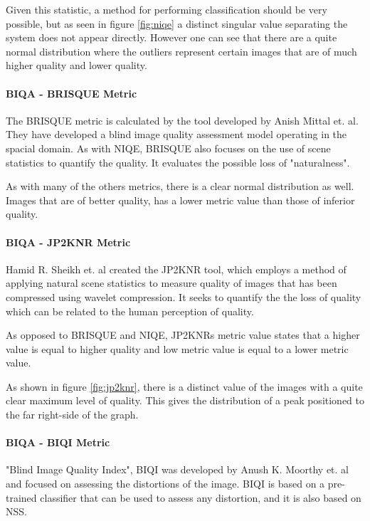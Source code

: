 Given this statistic, a method for performing classification should be very
possible, but as seen in figure \ref{fig:niqe} a distinct singular value
separating the system does not appear directly.  However one can see that there
are a quite normal distribution where the outliers represent certain images that
are of much higher quality and lower quality.


\paragraph{BIQA - BRISQUE Metric}
The BRISQUE metric is calculated by the tool developed by Anish Mittal et.
al\cite{brisque}. They have developed a blind image quality assessment model
operating in the spacial domain.  As with NIQE, BRISQUE also focuses on the use
of scene statistics to quantify the quality.  It evaluates the possible loss of
"naturalness".

As with many of the others metrics, there is a clear normal distribution as
well. Images that are of better quality, has a lower metric value than those of
inferior quality.


\paragraph{BIQA - JP2KNR Metric}
Hamid R. Sheikh et. al created the JP2KNR tool, which employs a method of
applying natural scene statistics to measure quality of images that has been
compressed using wavelet compression.  It seeks to quantify the the loss of
quality which can be related to the human perception of quality.

As opposed to BRISQUE and NIQE, JP2KNRs metric value states that a higher value
is equal to higher quality and low metric value is equal to a lower metric
value.

As shown in figure \ref{fig:jp2knr}, there is a distinct value of the images
with a quite clear maximum level of quality.  This gives the distribution of a
peak positioned to the far right-side of the graph.


\paragraph{BIQA - BIQI Metric}
"Blind Image Quality Index", BIQI\cite{biqi} was developed by Anush K. Moorthy
et. al and focused on assessing the distortions of the image.  BIQI is based on
a pre-trained classifier that can be used to assess any distortion, and it is
also based on NSS.

